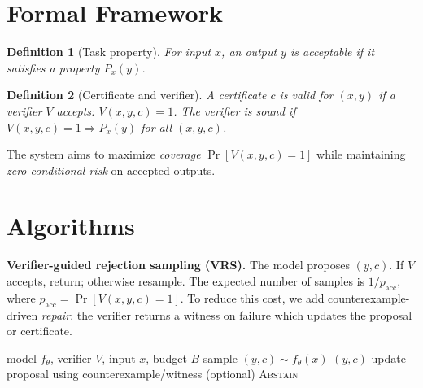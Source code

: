 \documentclass[11pt]{article}
\newtheorem{definition}{Definition}
\begin{document}
\section{Formal Framework}
\begin{definition}[Task property]
For input $x$, an output $y$ is acceptable if it satisfies a property $P_x(y)$.
\end{definition}

\begin{definition}[Certificate and verifier]
A certificate $c$ is valid for $(x,y)$ if a verifier $V$ accepts: $V(x,y,c)=1$.
The verifier is \emph{sound} if $V(x,y,c)=1 \Rightarrow P_x(y)$ for all $(x,y,c)$.
\end{definition}
The system aims to maximize \emph{coverage} $\Pr[V(x,y,c)=1]$ while maintaining \emph{zero conditional risk} on accepted outputs.

\section{Algorithms}
\textbf{Verifier-guided rejection sampling (VRS).} The model proposes $(y,c)$. If $V$ accepts, return; otherwise resample. The expected number of samples is $1/p_{\text{acc}}$, where $p_{\text{acc}}=\Pr[V(x,y,c)=1]$.
To reduce this cost, we add counterexample-driven \emph{repair}: the verifier returns a witness on failure which updates the proposal or certificate.

\begin{algorithm}
\caption{Verifier-Guided Rejection Sampling (VRS)}
\begin{algorithmic}
\Require model $f_\theta$, verifier $V$, input $x$, budget $B$
\State sample $(y,c)\sim f_\theta(x)$
 \Return $(y,c)$ \EndIf
\State update proposal using counterexample/witness (optional)
\EndFor
\State \Return \textsc{Abstain}
\end{algorithmic}
\end{algorithm}
\end{document}

